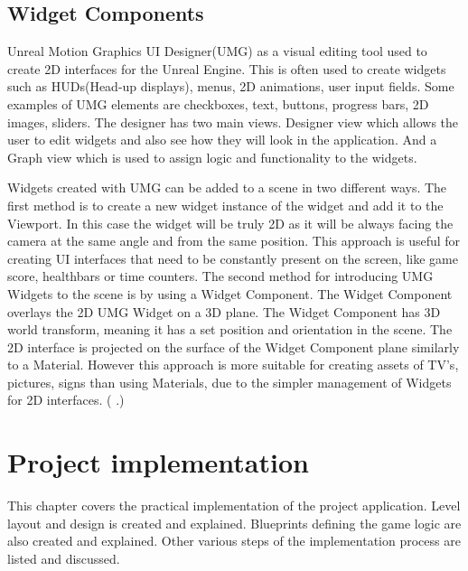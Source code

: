 \documentclass[12pt, a4paper,oneside, nocenter]{thesis}
\newcommand{\citeyeartitlexamk}[1]{(\usebibentry{#1}{title} \citeyear{#1}.)}
\begin{document}
\section{Widget Components}
Unreal Motion Graphics UI Designer(UMG) as a visual editing tool used to create 2D interfaces for the Unreal Engine. This is often used to create widgets such as HUDs(Head-up displays), menus, 2D animations, user input fields. Some examples of UMG elements are checkboxes, text, buttons, progress bars, 2D images, sliders. The designer has two main views. Designer view which allows the user to edit widgets and also see how they  will look in the application. And a Graph view which is used to assign logic and functionality to the widgets.
\par
Widgets created with UMG can be added to a scene in two different ways. The first method is to create a new widget instance of the widget and add it to the Viewport. In this case the widget will be truly 2D as it will be always facing the camera at the same angle and from the same position. This approach is useful for creating UI interfaces that need to be constantly present on the screen, like game score, healthbars or time counters. The second method for introducing UMG Widgets to the scene is by using a Widget Component. The Widget Component overlays the 2D UMG Widget on a 3D plane. The Widget Component has 3D world transform, meaning it has a set position and orientation in the scene. The 2D interface is projected on the surface of the Widget Component plane similarly to a Material. However this approach is more suitable for creating assets of TV's, pictures, signs than using Materials, due to the simpler management of Widgets for 2D interfaces. \citeyeartitlexamk{ue-umg}
\par
\chapter{\texorpdfstring{Project implementation}{proj-impl}}
This chapter covers the practical implementation of the project application. Level layout and design is created and explained. Blueprints defining the game logic are also created and explained. Other various steps of the implementation process are listed and discussed.
\end{document}
